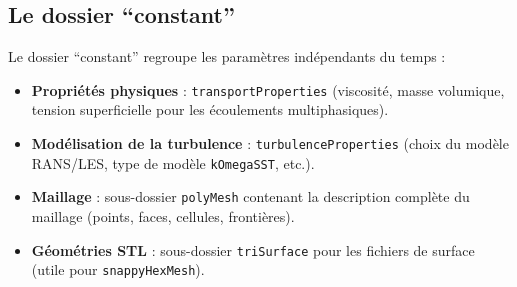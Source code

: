\begin{table}[H]
    \centering
    \caption{Conditions aux limites courantes dans OpenFOAM}
    \label{tab:boundary_conditions}
\end{table}

\subsection{Le dossier ``constant''}
\label{subsec:dossier_constant}

Le dossier ``constant'' regroupe les paramètres indépendants du temps \cite{greenshields2020openfoam} :
\begin{itemize}
    \item \textbf{Propriétés physiques} : \texttt{transportProperties} (viscosité, masse volumique, tension superficielle pour les écoulements multiphasiques).
    \item \textbf{Modélisation de la turbulence} : \texttt{turbulenceProperties} (choix du modèle RANS/LES, type de modèle \texttt{kOmegaSST}, etc.).
    \item \textbf{Maillage} : sous-dossier \texttt{polyMesh} contenant la description complète du maillage (points, faces, cellules, frontières).
    \item \textbf{Géométries STL} : sous-dossier \texttt{triSurface} pour les fichiers de surface (utile pour \texttt{snappyHexMesh}).
\end{itemize}

